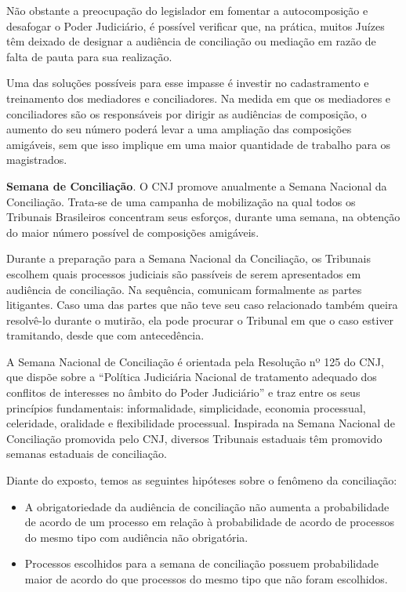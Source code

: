\documentclass[]{report}
\providecommand{\tightlist}{%
  \setlength{\itemsep}{0pt}\setlength{\parskip}{0pt}}
\begin{document}
Não obstante a preocupação do legislador em fomentar a autocomposição e
desafogar o Poder Judiciário, é possível verificar que, na prática,
muitos Juízes têm deixado de designar a audiência de conciliação ou
mediação em razão de falta de pauta para sua realização.

Uma das soluções possíveis para esse impasse é investir no cadastramento
e treinamento dos mediadores e conciliadores. Na medida em que os
mediadores e conciliadores são os responsáveis por dirigir as audiências
de composição, o aumento do seu número poderá levar a uma ampliação das
composições amigáveis, sem que isso implique em uma maior quantidade de
trabalho para os magistrados.

\textbf{Semana de Conciliação}. O CNJ promove anualmente a Semana
Nacional da Conciliação. Trata-se de uma campanha de mobilização na qual
todos os Tribunais Brasileiros concentram seus esforços, durante uma
semana, na obtenção do maior número possível de composições amigáveis.

Durante a preparação para a Semana Nacional da Conciliação, os Tribunais
escolhem quais processos judiciais são passíveis de serem apresentados
em audiência de conciliação. Na sequência, comunicam formalmente as
partes litigantes. Caso uma das partes que não teve seu caso relacionado
também queira resolvê-lo durante o mutirão, ela pode procurar o Tribunal
em que o caso estiver tramitando, desde que com antecedência.

A Semana Nacional de Conciliação é orientada pela Resolução nº 125 do
CNJ, que dispõe sobre a ``Política Judiciária Nacional de tratamento
adequado dos conflitos de interesses no âmbito do Poder Judiciário'' e
traz entre os seus princípios fundamentais: informalidade, simplicidade,
economia processual, celeridade, oralidade e flexibilidade processual.
Inspirada na Semana Nacional de Conciliação promovida pelo CNJ, diversos
Tribunais estaduais têm promovido semanas estaduais de conciliação.

Diante do exposto, temos as seguintes hipóteses sobre o fenômeno da
conciliação:

\begin{itemize}
\tightlist
\item
  A obrigatoriedade da audiência de conciliação não aumenta a
  probabilidade de acordo de um processo em relação à probabilidade de
  acordo de processos do mesmo tipo com audiência não obrigatória.
\item
  Processos escolhidos para a semana de conciliação possuem
  probabilidade maior de acordo do que processos do mesmo tipo que não
  foram escolhidos.
\end{itemize}
\end{document}
